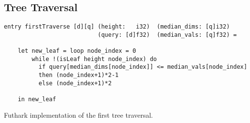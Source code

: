 \subsection{Tree Traversal}
\label{sec:traversal}



\begin{listing}[H]
\begin{verbatim}
entry firstTraverse [d][q] (height:   i32)  (median_dims: [q]i32)
                           (query: [d]f32)  (median_vals: [q]f32) =

    let new_leaf = loop node_index = 0
        while !(isLeaf height node_index) do
          if query[median_dims[node_index]] <= median_vals[node_index]
          then (node_index+1)*2-1
          else (node_index+1)*2

    in new_leaf
\end{verbatim}
\caption{Futhark implementation of the first tree traversal.}
\label{lst:first}
\end{listing}


